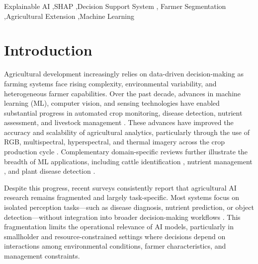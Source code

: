 \documentclass[3p,twocolumn,authoryear]{elsarticle}
\begin{document}
\begin{frontmatter}
\begin{abstract}
The SAR architecture offers a deployable and auditable framework for AI driven
human capital development in agricultural extension systems, subject to
population-specific recalibration.

\end{abstract}

\begin{keyword}
Explainable AI \sep SHAP \sep Decision Support System \sep
Farmer Segmentation \sep Agricultural Extension \sep Machine Learning
\end{keyword}

\end{frontmatter}


\section{Introduction}

Agricultural development increasingly relies on data-driven decision-making
as farming systems face rising complexity, environmental variability, and
heterogeneous farmer capabilities.
Over the past decade, advances in machine learning (ML), computer vision,
and sensing technologies have enabled substantial progress in automated
crop monitoring, disease detection, nutrient assessment, and livestock
management
\citep{kamilaris2018,liakos2018,ghazal2024survey,yang2025}.
These advances have improved the accuracy and scalability of agricultural
analytics, particularly through the use of RGB, multispectral,
hyperspectral, and thermal imagery across the crop production cycle
\citep{ghazal2024survey}.
Complementary domain-specific reviews further illustrate the breadth of ML
applications, including cattle identification
\citep{hossain2022cattle}, nutrient management
\citep{ennaji2023nutrient}, and plant disease detection
\citep{omaye2024disease}.

Despite this progress, recent surveys consistently report that agricultural
AI research remains fragmented and largely task-specific.
Most systems focus on isolated perception tasks—such as disease diagnosis,
nutrient prediction, or object detection—without integration into broader
decision-making workflows
\citep{ghazal2024survey,omaye2024disease}.
This fragmentation limits the operational relevance of AI models,
particularly in smallholder and resource-constrained settings where
decisions depend on interactions among environmental conditions, farmer
characteristics, and management constraints.
\end{document}
